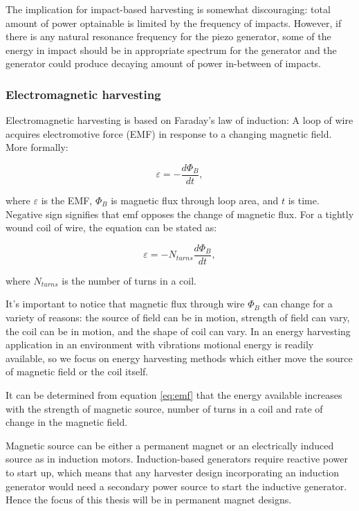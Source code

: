 The implication for impact-based harvesting is somewhat discouraging: total amount of power optainable is limited by the frequency of impacts. However, if there is any natural resonance frequency for the piezo generator, some of the energy in impact should be in appropriate spectrum for the generator and the generator could produce decaying amount of power in-between of impacts.

\subsubsection{Electromagnetic harvesting} \label{sect:em_harvest}
Electromagnetic harvesting is based on Faraday's law of induction: A loop of wire acquires electromotive force (EMF) in response to a changing magnetic field. More formally:

\begin{equation}
  \varepsilon = - \frac{d \Phi_ {B}}{d t} , 
\end{equation}

where $\varepsilon$ is the EMF, $\Phi_{B}$ is magnetic flux through loop area, and $t$ is time. Negative sign signifies that emf opposes the change of magnetic flux. For a tightly wound coil of wire, the equation can be stated as: 

\begin{equation} \label{eq:emf}
  \varepsilon = -N_{turns} \frac{d \Phi_{B}}{d t} , 
\end{equation}

where $N_{turns}$ is the number of turns in a coil. \cite[p.999]{universityphysics}

It's important to notice that magnetic flux through wire $ \Phi_{B} $ can change for a variety of reasons: the source of field can be in motion, strength of field can vary, the coil can be in motion, and the shape of coil can vary. In an energy harvesting application in an environment with vibrations motional energy is readily available, so we focus on energy harvesting methods which either move the source of magnetic field or the coil itself.

It can be determined from equation \eqref{eq:emf} that the energy available increases with the strength of magnetic source, number of turns in a coil and rate of change in the magnetic field. 

Magnetic source can be either a permanent magnet or an electrically induced source as in induction motors. Induction-based generators require reactive power to start up, which means that any harvester design incorporating an induction generator would need a secondary power source to start the inductive generator. Hence the focus of this thesis will be in permanent magnet designs.

